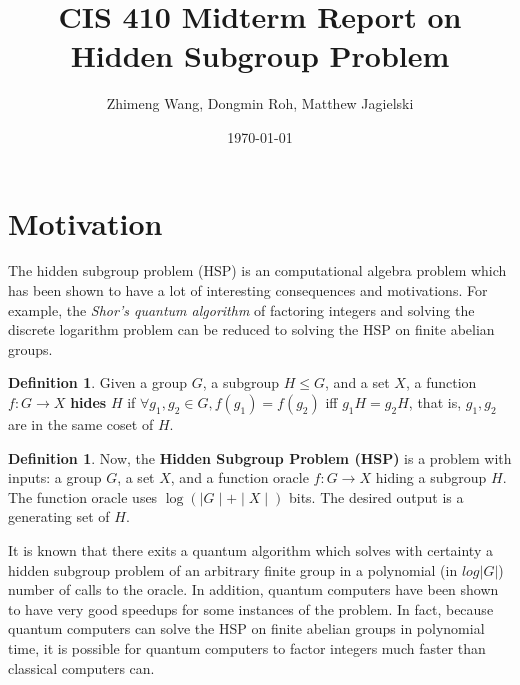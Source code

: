 \documentclass[dvips,12pt]{article}
\theoremstyle{plain}
\theoremstyle{definition}
\newtheorem{defn}[thm]{Definition} %
\begin{document}

\title{CIS 410 Midterm Report on Hidden Subgroup Problem}
\author{Zhimeng Wang, Dongmin Roh, Matthew Jagielski}
\date{\today}



\maketitle


\section{Motivation}

The hidden subgroup problem (HSP) is an computational algebra problem which has been shown to have a lot of interesting consequences and motivations. For example, the \emph{Shor's quantum algorithm} of factoring integers and solving the discrete logarithm problem can be reduced to solving the HSP on finite abelian groups.

\begin{defn}
Given a group $G$, a subgroup $H\le G$, and a set $X$, a function $f:G\rightarrow X$ \textbf{hides} $H$ if $\forall g_1,g_2\in G, f(g_1)=f(g_2)$ iff $g_1H=g_2H$, that is, $g_1,g_2$ are in the same coset of $H$.
\end{defn}

\begin{defn}
Now, the \textbf{Hidden Subgroup Problem (HSP)} is a problem with inputs: a group $G$, a set $X$, and a function oracle $f: G\rightarrow X$ hiding a subgroup $H$. The function oracle uses $\log(\mid G\mid + \mid X\mid)$ bits. The desired output is a generating set of $H$.
\end{defn}

It is known that there exits a quantum algorithm which solves with certainty a hidden subgroup problem of an arbitrary finite group in a polynomial (in $log|G|$) number of calls to the oracle. In addition, quantum computers have been shown to have very good speedups for some instances of the problem. In fact, because quantum computers can solve the HSP on finite abelian groups in polynomial time, it is possible for quantum computers to factor integers much faster than classical computers can.\\
\end{document}
